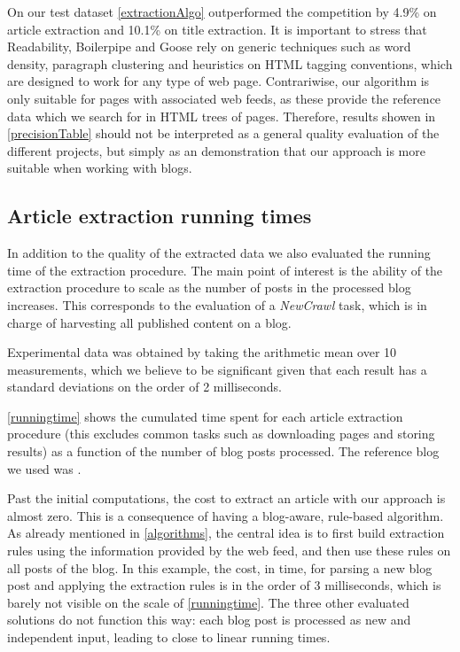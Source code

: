 On our test dataset \autoref{extractionAlgo} outperformed the competition by 4.9\% on article extraction and 10.1\% on title extraction. It is important to stress that Readability, Boilerpipe and Goose rely on generic techniques such as word density, paragraph clustering and heuristics on HTML tagging conventions, which are designed to work for any type of web page. Contrariwise, our algorithm is only suitable for pages with associated web feeds, as these provide the reference data which we search for in HTML trees of pages. Therefore, results showen in \autoref{precisionTable} should not be interpreted as a general quality evaluation of the different projects, but simply as an demonstration that our approach is more suitable when working with blogs.


\subsection{Article extraction running times}

In addition to the quality of the extracted data we also evaluated the running time of the extraction procedure. The main point of interest is the ability of the extraction procedure to scale as the number of posts in the processed blog increases. This corresponds to the evaluation of a \emph{NewCrawl} task, which is in charge of harvesting all published content on a blog.

Experimental data was obtained by taking the arithmetic mean over 10 measurements, which we believe to be significant given that each result has a standard deviations on the order of 2 milliseconds. 

\autoref{runningtime} shows the cumulated time spent for each article extraction procedure (this excludes common tasks such as downloading pages and storing results) as a function of the number of blog posts processed. The reference blog we used was .



Past the initial computations, the cost to extract an article with our approach is almost zero. This is a consequence of having a blog-aware, rule-based algorithm. As already mentioned in \autoref{algorithms}, the central idea is to first build extraction rules using the information provided by the web feed, and then use these rules on all posts of the blog. In this example, the cost, in time, for parsing a new blog post and applying the extraction rules is in the order of 3 milliseconds, which is barely not visible on the scale of \autoref{runningtime}. The three other evaluated solutions do not function this way: each blog post is processed as new and independent input, leading to close to linear running times.

